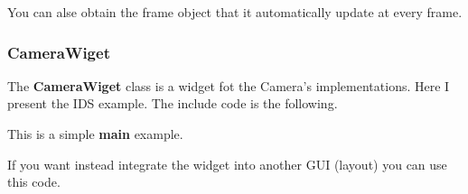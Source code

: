 You can alse obtain the frame object that it automatically update at
every frame.

\begin{Shaded}
\begin{Highlighting}[]
\end{Highlighting}
\end{Shaded}

\hypertarget{camerawiget}{%
\subsubsection{CameraWiget}\label{camerawiget}}

The \textbf{CameraWiget} class is a widget fot the Camera's
implementations. Here I present the IDS example. The include code is the
following.

\begin{Shaded}
\begin{Highlighting}[]
 
\end{Highlighting}
\end{Shaded}

This is a simple \textbf{main} example.

\begin{Shaded}
\begin{Highlighting}[]
\NormalTok{\}}
\end{Highlighting}
\end{Shaded}

If you want instead integrate the widget into another GUI (layout) you
can use this code.

